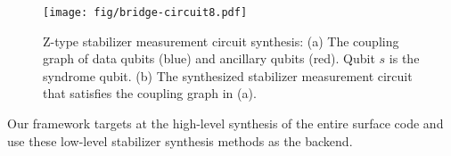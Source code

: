 %


\begin{figure}[ht!]
    \centering
    \texttt{[image: fig/bridge-circuit8.pdf]}    %
    \caption{ Z-type stabilizer measurement circuit synthesis: (a) The coupling graph of data qubits (blue) and ancillary qubits (red). Qubit $s$ is the syndrome qubit. (b) The synthesized stabilizer measurement circuit that satisfies the coupling graph in (a). }\label{fig:bridge_circuit_1}
%
\end{figure}

Our framework targets at the high-level synthesis of the entire surface code and use these low-level stabilizer synthesis methods as the backend.


